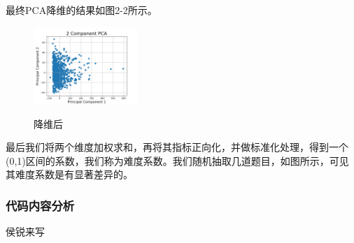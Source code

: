 \documentclass[UTF8]{ctexart}
\begin{document}
	\par 最终PCA降维的结果如图2-2所示。
	\begin{figure}[!htbp]
		\centering
		\includegraphics[width=0.35\textwidth]{Figure_1.png}\\
		\caption{降维后}
	\end{figure}
	\par 最后我们将两个维度加权求和，再将其指标正向化，并做标准化处理，得到一个(0,1)区间的系数，我们称为难度系数。我们随机抽取几道题目，如图所示，可见其难度系数是有显著差异的。
	\subsubsection{代码内容分析}
	侯锐来写
	
\end{document}
